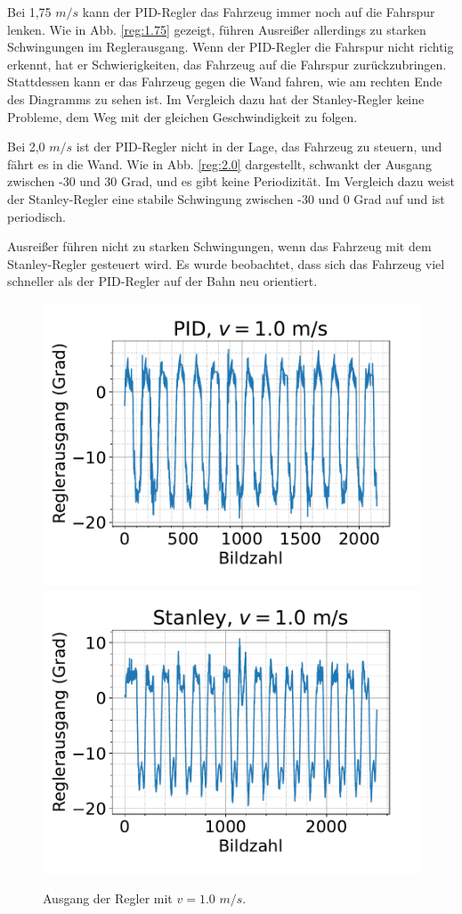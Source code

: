\documentclass[arbeit=studie,oneside,BCOR=12mm]{ArbeitRST}
\begin{document}
Bei 1,75 $m/s$ kann der PID-Regler das Fahrzeug immer noch auf die Fahrspur
lenken. Wie in Abb. \ref{reg:1.75} gezeigt, führen Ausreißer allerdings zu starken
Schwingungen im Reglerausgang. Wenn der PID-Regler die Fahrspur nicht richtig
erkennt, hat er Schwierigkeiten, das Fahrzeug auf die Fahrspur zurückzubringen.
Stattdessen kann er das Fahrzeug gegen die Wand fahren, wie am rechten Ende des
Diagramms zu sehen ist. Im Vergleich dazu hat der Stanley-Regler keine
Probleme, dem Weg mit der gleichen Geschwindigkeit zu folgen.

Bei 2,0 $m/s$ ist der PID-Regler nicht in der Lage, das Fahrzeug zu steuern, und
fährt es in die Wand. Wie in Abb. \ref{reg:2.0} dargestellt, schwankt der Ausgang
zwischen -30 und 30 Grad, und es gibt keine Periodizität. Im Vergleich dazu
weist der Stanley-Regler eine stabile Schwingung zwischen -30 und 0 Grad auf
und ist periodisch.

Ausreißer führen nicht zu starken Schwingungen, wenn das Fahrzeug mit dem
Stanley-Regler gesteuert wird. Es wurde beobachtet, dass sich das Fahrzeug viel
schneller als der PID-Regler auf der Bahn neu orientiert.

\begin{figure}[h]
    \centering
    \includegraphics[scale=0.47]{pid1.0}
    \includegraphics[scale=0.47]{Stan1.0}
    \caption{Ausgang der Regler mit $v = 1.0$ $m/s$.}
    \label{reg:1.0}
\end{figure}
\end{document}
